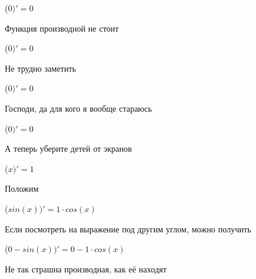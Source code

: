 \documentclass[12pt,a4paper,fleqn]{article}
\begin{document}
\begin{center}
\begin{center}
\begin{center}
\begin{center}
\begin{center}
\begin{center}
\begin{center}
\begin{center}
\begin{center}
\begin{center}
\begin{center}
\begin{center}
\begin{center}
\begin{center}
\begin{center}
\begin{center}
\begin{center}
\begin{center}
\begin{center}
\begin{center}
\begin{center}
\begin{center}
\begin{center}
\begin{center}
\begin{center}
\begin{center}
\begin{center}
\begin{center}
\begin{center}
\begin{center}
\begin{center}
\begin{center}
\begin{center}
\begin{center}
\begin{center}
\begin{center}
\begin{center}
\begin{center}
\begin{center}
\begin{center}
\begin{center}
\begin{center}
\begin{center}
\begin{center}
\begin{center}
\begin{center}
\begin{center}
\begin{center}
\begin{center}
\begin{center}
\begin{center}
\begin{center}
\begin{center}
\begin{center}
\begin{center}
\begin{center}
\begin{center}
\begin{center}
\begin{center}
\begin{center}
\begin{center}
\begin{center}
\begin{center}
\begin{center}
\begin{center}
\begin{center}
\begin{center}
\begin{center}
 ($0)'
  = 0$\end{center}
Функция производной не стоит\cite{link2}

\begin{center}
 ($0)'
  = 0$\end{center}
Не трудно заметить

\begin{center}
 ($0)'
  = 0$\end{center}
Господи, да для кого я вообще стараюсь

\begin{center}
 ($0)'
  = 0$\end{center}
А теперь уберите детей от экранов

\begin{center}
 ($x)'
  = 1$\end{center}
Положим

\begin{center}
 ($sin(x))'
  = 1 \cdot cos(x)$\end{center}
Если посмотреть на выражение под другим углом, можно получить

\begin{center}
 ($0-sin(x))'
  = 0-1 \cdot cos(x)$\end{center}
Не так страшна производная, как её находят\cite{link2}


\end{center}
\end{center}
\end{center}
\end{center}
\end{center}
\end{center}
\end{center}
\end{center}
\end{center}
\end{center}
\end{center}
\end{center}
\end{center}
\end{center}
\end{center}
\end{center}
\end{center}
\end{center}
\end{center}
\end{center}
\end{center}
\end{center}
\end{center}
\end{center}
\end{center}
\end{center}
\end{center}
\end{center}
\end{center}
\end{center}
\end{center}
\end{center}
\end{center}
\end{center}
\end{center}
\end{center}
\end{center}
\end{center}
\end{center}
\end{center}
\end{center}
\end{center}
\end{center}
\end{center}
\end{center}
\end{center}
\end{center}
\end{center}
\end{center}
\end{center}
\end{center}
\end{center}
\end{center}
\end{center}
\end{center}
\end{center}
\end{center}
\end{center}
\end{center}
\end{center}
\end{center}
\end{center}
\end{center}
\end{center}
\end{center}
\end{center}
\end{center}
\end{document}
